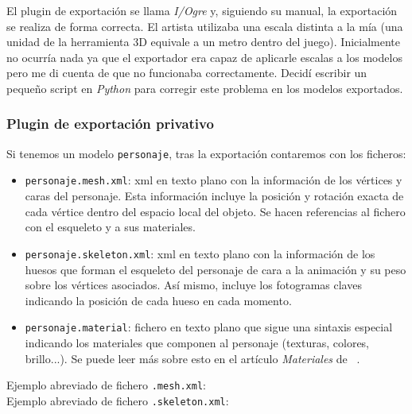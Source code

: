
El plugin de exportación se llama \textit{I/Ogre} y, siguiendo su manual,
la exportación se realiza de forma correcta. El artista utilizaba una escala
distinta a la mía (una unidad de la herramienta 3D equivale a un metro
dentro del juego). Inicialmente no ocurría nada ya que el exportador era
capaz de aplicarle escalas a los modelos pero me di cuenta de que no funcionaba
correctamente. Decidí escribir un pequeño script en \textit{Python} para corregir
este problema en los modelos exportados.\\

\subsubsection{Plugin de exportación privativo}

Si tenemos un modelo \texttt{personaje}, tras la exportación contaremos
con los ficheros:

\begin{itemize}
    \item \texttt{personaje.mesh.xml}: xml en texto plano con la información
    de los vértices y caras del personaje. Esta información incluye la posición
    y rotación exacta de cada vértice dentro del espacio local del objeto.
    Se hacen referencias al fichero con el esqueleto y a sus materiales.
    \item \texttt{personaje.skeleton.xml}: xml en texto plano con la información
    de los huesos que forman el esqueleto del personaje de cara a la animación
    y su peso sobre los vértices asociados. Así mismo, incluye los fotogramas
    claves indicando la posición de cada hueso en cada momento.
    \item \texttt{personaje.material}: fichero en texto plano que sigue
    una sintaxis especial indicando los materiales que componen al personaje
    (texturas, colores, brillo...). Se puede leer más sobre esto en el artículo
    \textit{Materiales} de \wiki\ \cite{website:materiales}.
\end{itemize}

Ejemplo abreviado de fichero \texttt{.mesh.xml}:\\



Ejemplo abreviado de fichero \texttt{.skeleton.xml}:\\

